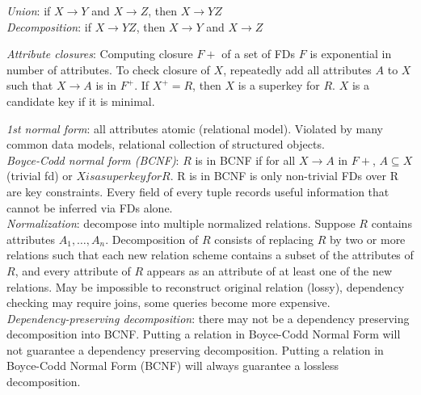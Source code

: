 \documentclass[10pt,landscape]{article}
\begin{document}
\begin{multicols}{3}
\textit{Union}: if $X \rightarrow Y$ and $X \rightarrow Z$, then $X \rightarrow YZ$ \\
\textit{Decomposition}: if $X \rightarrow YZ$, then $X \rightarrow Y$ and $X \rightarrow Z$

\textit{Attribute closures}: Computing closure $F+$ of a set of FDs $F$ is exponential in number of attributes. To check closure of $X$, repeatedly add all attributes $A$ to $X$ such that $X \rightarrow A$ is in $F^+$. If $X^+ = R$, then $X$ is a superkey for $R$. $X$ is a candidate key if it is minimal.

\textit{1st normal form}: all attributes atomic (relational model). Violated by many common data models, relational collection of structured objects. \\
\textit{Boyce-Codd normal form (BCNF)}: $R$ is in BCNF if for all $X \rightarrow A$ in $F+$, $A \subseteq X$ (trivial fd) or $X is a superkey for R$. R is in BCNF is only non-trivial FDs over R are key constraints. Every field of every tuple records useful information that cannot be inferred via FDs alone. \\
\textit{Normalization}: decompose into multiple normalized relations. Suppose $R$ contains attributes $A_1, \ldots, A_n$. Decomposition of $R$ consists of replacing $R$ by two or more relations such that each new relation scheme contains a subset of the attributes of $R$, and every attribute of $R$ appears as an attribute of at least one of the new relations. May be impossible to reconstruct original relation (lossy), dependency checking may require joins, some queries become more expensive. \\
\textit{Dependency-preserving decomposition}: there may not be a dependency preserving decomposition into BCNF. Putting a relation in Boyce-Codd Normal Form will not guarantee a dependency preserving decomposition. Putting a relation in Boyce-Codd Normal Form (BCNF) will always guarantee a lossless decomposition.


\end{multicols}
\end{document}
